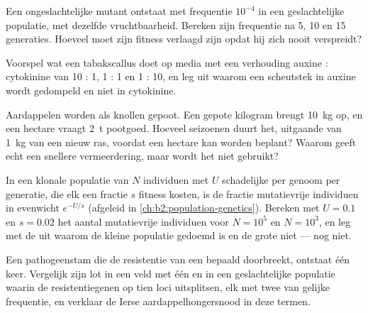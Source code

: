 \begin{exercise}[$\star\star$]\label{exo:b2:asexual-reproduction:7}
Een ongeslachtelijke mutant ontstaat met frequentie $10^{-4}$ in een
geslachtelijke populatie, met dezelfde vruchtbaarheid. Bereken zijn
frequentie na 5, 10 en 15 generaties. Hoeveel moet zijn fitness verlaagd
zijn opdat hij zich nooit verspreidt?
\end{exercise}

\begin{exercise}[$\star\star$]\label{exo:b2:asexual-reproduction:8}
Voorspel wat een tabakscallus doet op media met een verhouding auxine :
cytokinine van 10 : 1, 1 : 1 en 1 : 10, en leg uit waarom een scheutstek in
auxine wordt gedompeld en niet in cytokinine.
\end{exercise}

\begin{exercise}[$\star\star$]\label{exo:b2:asexual-reproduction:9}
Aardappelen worden als knollen gepoot. Een gepote kilogram brengt
\qty{10}{kg} op, en een hectare vraagt \qty{2}{t} pootgoed. Hoeveel
seizoenen duurt het, uitgaande van \qty{1}{kg} van een nieuw ras, voordat
een hectare kan worden beplant? Waarom geeft echt  een snellere
vermeerdering, maar wordt het niet gebruikt?
\end{exercise}

\begin{exercise}[$\star\star\star$]\label{exo:b2:asexual-reproduction:10}
In een klonale populatie van $N$ individuen met $U$ schadelijke 
per genoom per generatie, die elk een fractie $s$ fitness kosten, is de
fractie mutatievrije individuen in evenwicht
$e^{-U/s}$ (afgeleid in \cref{ch:b2:population-genetics}). Bereken met $U =
0.1$ en $s = 0.02$ het aantal mutatievrije
individuen voor $N = 10^{5}$ en $N = 10^{3}$, en leg met de  uit waarom de kleine populatie gedoemd is en de grote niet ---
nog niet.
\end{exercise}

\begin{exercise}[$\star\star\star$]\label{exo:b2:asexual-reproduction:11}
Een pathogeenstam die de resistentie van een bepaald  doorbreekt,
ontstaat één keer. Vergelijk zijn lot in een veld met één  en in een
geslachtelijke populatie waarin de resistentiegenen op tien loci
uitsplitsen, elk met twee  van gelijke frequentie, en verklaar de
Ierse aardappelhongersnood in deze termen.
\end{exercise}

